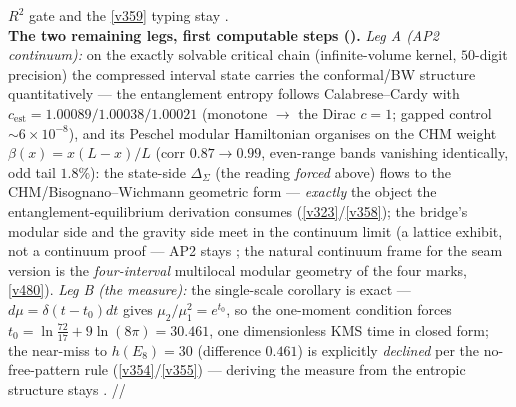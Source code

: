 \documentclass[11pt,a4paper]{article}
\begin{document}
\begin{keybox}
$R^2$ gate and the \vref{v359} typing stay \mO.
\smallskip\\
\noindent\textbf{The two remaining legs, first computable steps ().}
\emph{Leg A (AP2 continuum):} on the exactly solvable critical chain (infinite-volume kernel, $50$-digit
precision) the compressed interval state carries the conformal/BW structure quantitatively --- the
entanglement entropy follows Calabrese--Cardy with $c_{\mathrm{est}}=1.00089/1.00038/1.00021$ (monotone
$\to$ the Dirac $c{=}1$; gapped control $\sim6{\times}10^{-8}$), and its Peschel modular Hamiltonian
organises on the CHM weight $\beta(x){=}x(L{-}x)/L$ (corr $0.87{\to}0.99$, even-range bands vanishing
identically, odd tail $1.8\%$): the state-side $\Delta_\Sigma$ (the reading \emph{forced} above) flows
to the CHM/Bisognano--Wichmann geometric form --- \emph{exactly} the object the entanglement-equilibrium
derivation consumes (\vref{v323}/\vref{v358}); the bridge's modular side and the gravity side meet in
the continuum limit (a lattice exhibit, not a continuum proof --- AP2 stays \mO; the natural continuum
frame for the seam version is the \emph{four-interval} multilocal modular geometry of the four marks,
\vref{v480}). \emph{Leg B (the
measure):} the single-scale corollary is exact --- $d\mu{=}\delta(t{-}t_0)dt$ gives
$\mu_2/\mu_1^2{=}e^{t_0}$, so the one-moment condition forces $t_0{=}\ln\tfrac{72}{17}{+}9\ln(8\pi)
{=}30.461$, one dimensionless KMS time in closed form; the near-miss to $h(E_8){=}30$ (difference
$0.461$) is explicitly \emph{declined} per the no-free-pattern rule (\vref{v354}/\vref{v355}) ---
deriving the measure from the entropic structure stays \mO.
\mE/\mC/\mO
\end{keybox}
\end{document}
